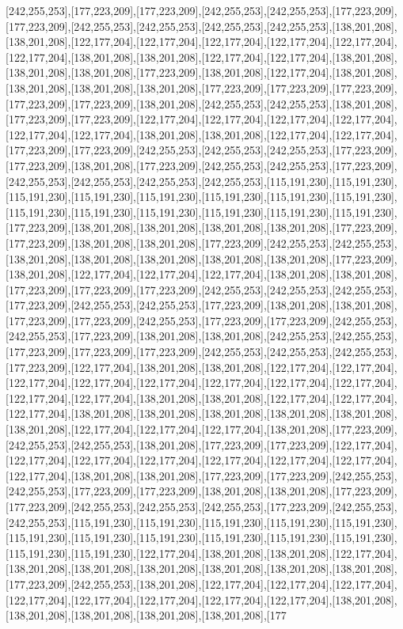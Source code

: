 [242,255,253],[177,223,209],[177,223,209],[242,255,253],[242,255,253],[177,223,209],[177,223,209],[242,255,253],[242,255,253],[242,255,253],[242,255,253],[138,201,208],[138,201,208],[122,177,204],[122,177,204],[122,177,204],[122,177,204],[122,177,204],[122,177,204],[138,201,208],[138,201,208],[122,177,204],[122,177,204],[138,201,208],[138,201,208],[138,201,208],[177,223,209],[138,201,208],[122,177,204],[138,201,208],[138,201,208],[138,201,208],[138,201,208],[177,223,209],[177,223,209],[177,223,209],[177,223,209],[177,223,209],[138,201,208],[242,255,253],[242,255,253],[138,201,208],[177,223,209],[177,223,209],[122,177,204],[122,177,204],[122,177,204],[122,177,204],[122,177,204],[122,177,204],[138,201,208],[138,201,208],[122,177,204],[122,177,204],[177,223,209],[177,223,209],[242,255,253],[242,255,253],[242,255,253],[177,223,209],[177,223,209],[138,201,208],[177,223,209],[242,255,253],[242,255,253],[177,223,209],[242,255,253],[242,255,253],[242,255,253],[242,255,253],[115,191,230],[115,191,230],[115,191,230],[115,191,230],[115,191,230],[115,191,230],[115,191,230],[115,191,230],[115,191,230],[115,191,230],[115,191,230],[115,191,230],[115,191,230],[115,191,230],[177,223,209],[138,201,208],[138,201,208],[138,201,208],[138,201,208],[177,223,209],[177,223,209],[138,201,208],[138,201,208],[177,223,209],[242,255,253],[242,255,253],[138,201,208],[138,201,208],[138,201,208],[138,201,208],[138,201,208],[177,223,209],[138,201,208],[122,177,204],[122,177,204],[122,177,204],[138,201,208],[138,201,208],[177,223,209],[177,223,209],[177,223,209],[242,255,253],[242,255,253],[242,255,253],[177,223,209],[242,255,253],[242,255,253],[177,223,209],[138,201,208],[138,201,208],[177,223,209],[177,223,209],[242,255,253],[177,223,209],[177,223,209],[242,255,253],[242,255,253],[177,223,209],[138,201,208],[138,201,208],[242,255,253],[242,255,253],[177,223,209],[177,223,209],[177,223,209],[242,255,253],[242,255,253],[242,255,253],[177,223,209],[122,177,204],[138,201,208],[138,201,208],[122,177,204],[122,177,204],[122,177,204],[122,177,204],[122,177,204],[122,177,204],[122,177,204],[122,177,204],[122,177,204],[122,177,204],[138,201,208],[138,201,208],[122,177,204],[122,177,204],[122,177,204],[138,201,208],[138,201,208],[138,201,208],[138,201,208],[138,201,208],[138,201,208],[122,177,204],[122,177,204],[122,177,204],[138,201,208],[177,223,209],[242,255,253],[242,255,253],[138,201,208],[177,223,209],[177,223,209],[122,177,204],[122,177,204],[122,177,204],[122,177,204],[122,177,204],[122,177,204],[122,177,204],[122,177,204],[138,201,208],[138,201,208],[177,223,209],[177,223,209],[242,255,253],[242,255,253],[177,223,209],[177,223,209],[138,201,208],[138,201,208],[177,223,209],[177,223,209],[242,255,253],[242,255,253],[242,255,253],[177,223,209],[242,255,253],[242,255,253],[115,191,230],[115,191,230],[115,191,230],[115,191,230],[115,191,230],[115,191,230],[115,191,230],[115,191,230],[115,191,230],[115,191,230],[115,191,230],[115,191,230],[115,191,230],[122,177,204],[138,201,208],[138,201,208],[122,177,204],[138,201,208],[138,201,208],[138,201,208],[138,201,208],[138,201,208],[138,201,208],[177,223,209],[242,255,253],[138,201,208],[122,177,204],[122,177,204],[122,177,204],[122,177,204],[122,177,204],[122,177,204],[122,177,204],[122,177,204],[138,201,208],[138,201,208],[138,201,208],[138,201,208],[138,201,208],[177